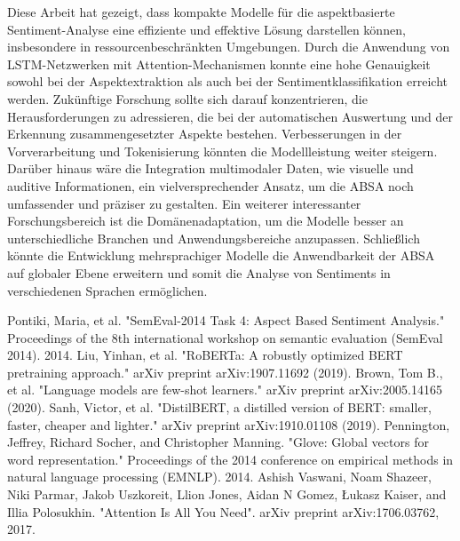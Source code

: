 \documentclass[12pt]{article}
\begin{document}
Diese Arbeit hat gezeigt, dass kompakte Modelle für die aspektbasierte Sentiment-Analyse eine effiziente und effektive Lösung darstellen können, insbesondere in ressourcenbeschränkten Umgebungen. Durch die Anwendung von LSTM-Netzwerken mit Attention-Mechanismen konnte eine hohe Genauigkeit sowohl bei der Aspektextraktion als auch bei der Sentimentklassifikation erreicht werden.
\newline
\newline
Zukünftige Forschung sollte sich darauf konzentrieren, die Herausforderungen zu adressieren, die bei der automatischen Auswertung und der Erkennung zusammengesetzter Aspekte bestehen. Verbesserungen in der Vorverarbeitung und Tokenisierung könnten die Modellleistung weiter steigern. Darüber hinaus wäre die Integration multimodaler Daten, wie visuelle und auditive Informationen, ein vielversprechender Ansatz, um die ABSA noch umfassender und präziser zu gestalten.
\newline
\newline
Ein weiterer interessanter Forschungsbereich ist die Domänenadaptation, um die Modelle besser an unterschiedliche Branchen und Anwendungsbereiche anzupassen. Schließlich könnte die Entwicklung mehrsprachiger Modelle die Anwendbarkeit der ABSA auf globaler Ebene erweitern und somit die Analyse von Sentiments in verschiedenen Sprachen ermöglichen.

\begin{thebibliography}{9}
     Pontiki, Maria, et al. "SemEval-2014 Task 4: Aspect Based Sentiment Analysis." Proceedings of the 8th international workshop on semantic evaluation (SemEval 2014). 2014.
     Liu, Yinhan, et al. "RoBERTa: A robustly optimized BERT pretraining approach." arXiv preprint arXiv:1907.11692 (2019).
     Brown, Tom B., et al. "Language models are few-shot learners." arXiv preprint arXiv:2005.14165 (2020).
     Sanh, Victor, et al. "DistilBERT, a distilled version of BERT: smaller, faster, cheaper and lighter." arXiv preprint arXiv:1910.01108 (2019).
     Pennington, Jeffrey, Richard Socher, and Christopher Manning. "Glove: Global vectors for word representation." Proceedings of the 2014 conference on empirical methods in natural language processing (EMNLP). 2014.
     Ashish Vaswani, Noam Shazeer, Niki Parmar, Jakob Uszkoreit, Llion Jones, Aidan N Gomez, Łukasz Kaiser, and Illia Polosukhin. "Attention Is All You Need". arXiv preprint arXiv:1706.03762, 2017.

\end{thebibliography}
\newpage
\end{document}
